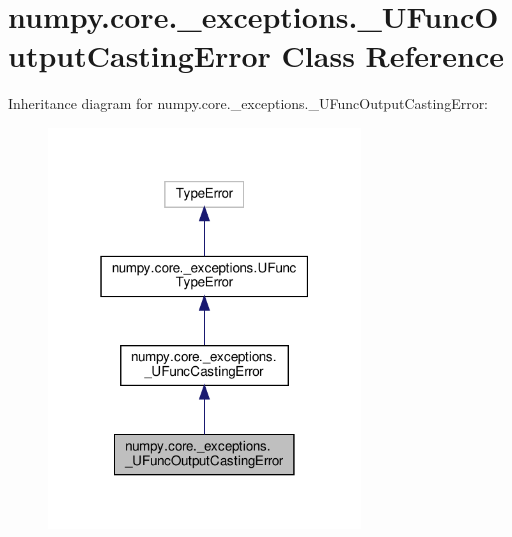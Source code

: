 \hypertarget{classnumpy_1_1core_1_1__exceptions_1_1__UFuncOutputCastingError}{}\section{numpy.\+core.\+\_\+exceptions.\+\_\+\+U\+Func\+Output\+Casting\+Error Class Reference}
\label{classnumpy_1_1core_1_1__exceptions_1_1__UFuncOutputCastingError}


Inheritance diagram for numpy.\+core.\+\_\+exceptions.\+\_\+\+U\+Func\+Output\+Casting\+Error\+:
\nopagebreak
\begin{figure}[H]
\begin{center}
\leavevmode
\includegraphics[width=235pt]{classnumpy_1_1core_1_1__exceptions_1_1__UFuncOutputCastingError__inherit__graph}
\end{center}
\end{figure}


